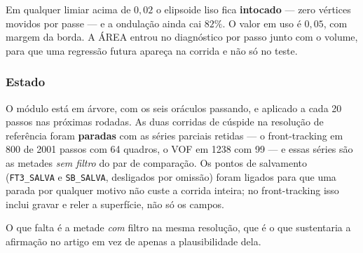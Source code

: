 Em qualquer limiar acima de $0{,}02$ o elipsoide liso fica \textbf{intocado} ---
zero v\'ertices movidos por passe --- e a ondula\c{c}\~ao ainda cai $82\%$. O
valor em uso \'e $0{,}05$, com margem da borda. A \'AREA entrou no
diagn\'ostico por passo junto com o volume, para que uma regress\~ao futura
apare\c{c}a na corrida e n\~ao s\'o no teste.

\subsubsection{Estado}

O m\'odulo est\'a em \'arvore, com os seis or\'aculos passando, e aplicado a
cada 20 passos nas pr\'oximas rodadas. As duas corridas de c\'uspide na
resolu\c{c}\~ao de refer\^encia foram \textbf{paradas} com as s\'eries parciais
retidas --- o front-tracking em 800 de 2001 passos com 64 quadros, o VOF em
1238 com 99 --- e essas s\'eries s\~ao as metades \emph{sem filtro} do par de
compara\c{c}\~ao. Os pontos de salvamento (\texttt{FT3\_SALVA} e
\texttt{SB\_SALVA}, desligados por omiss\~ao) foram ligados para que uma
parada por qualquer motivo n\~ao custe a corrida inteira; no front-tracking
isso inclui gravar e reler a superf\'icie, n\~ao s\'o os campos.

O que falta \'e a metade \emph{com} filtro na mesma resolu\c{c}\~ao, que \'e o
que sustentaria a afirma\c{c}\~ao no artigo em vez de apenas a
plausibilidade dela.
